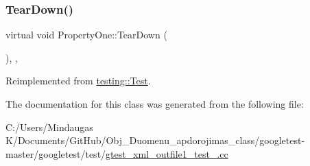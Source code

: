 \subsubsection{\texorpdfstring{TearDown()}{TearDown()}\hspace{0.1cm}{\footnotesize\ttfamily [3/3]}}
{\footnotesize\ttfamily virtual void Property\+One\+::\+Tear\+Down (\begin{DoxyParamCaption}{ }\end{DoxyParamCaption})\hspace{0.3cm}{\ttfamily [inline]}, {\ttfamily [protected]}, {\ttfamily [virtual]}}



Reimplemented from \mbox{\hyperlink{classtesting_1_1_test_a5f0ab439802cbe0ef7552f1a9f791923}{testing\+::\+Test}}.



The documentation for this class was generated from the following file\+:\begin{DoxyCompactItemize}
\item 
C\+:/\+Users/\+Mindaugas K/\+Documents/\+Git\+Hub/\+Obj\+\_\+\+Duomenu\+\_\+apdorojimas\+\_\+class/googletest-\/master/googletest/test/\mbox{\hyperlink{googletest-master_2googletest_2test_2gtest__xml__outfile1__test___8cc}{gtest\+\_\+xml\+\_\+outfile1\+\_\+test\+\_\+.\+cc}}\end{DoxyCompactItemize}
